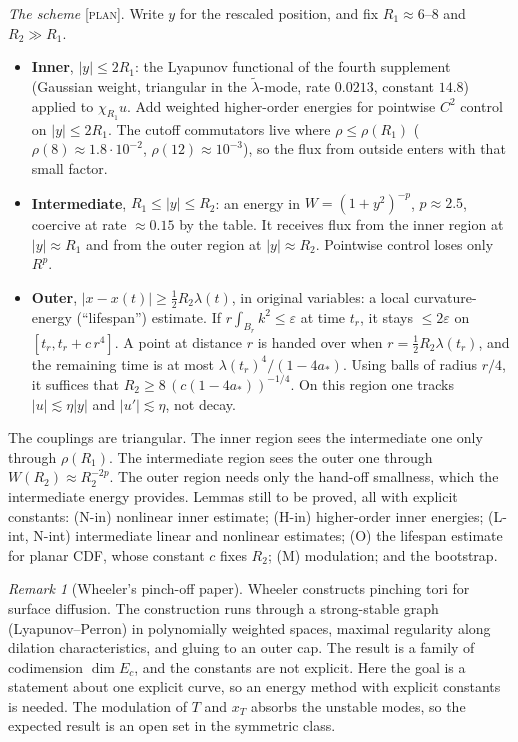 \documentclass[11pt]{amsart}
\theoremstyle{remark}
\newtheorem{remark}[theorem]{Remark}
\newcommand{\eps}{\varepsilon}
\newcommand{\lab}[1]{\textup{\textsc{[#1]}}}
\begin{document}
\emph{The scheme} \lab{plan}. Write $y$ for the rescaled position, and fix $R_1\approx6$--$8$ and $R_2\gg R_1$.
\begin{itemize}
\item \textbf{Inner}, $|y|\le2R_1$: the Lyapunov functional of the fourth supplement (Gaussian weight, triangular in the $\tilde\lambda$-mode, rate $0.0213$, constant $14.8$) applied to $\chi_{R_1}u$. Add weighted higher-order energies for pointwise $C^2$ control on $|y|\le2R_1$. The cutoff commutators live where $\rho\le\rho(R_1)$ ($\rho(8)\approx1.8\cdot10^{-2}$, $\rho(12)\approx10^{-3}$), so the flux from outside enters with that small factor.
\item \textbf{Intermediate}, $R_1\le|y|\le R_2$: an energy in $W=(1+y^2)^{-p}$, $p\approx2.5$, coercive at rate $\approx0.15$ by the table. It receives flux from the inner region at $|y|\approx R_1$ and from the outer region at $|y|\approx R_2$. Pointwise control loses only $R^{p}$.
\item \textbf{Outer}, $|x-x(t)|\ge\frac12R_2\lambda(t)$, in original variables: a local curvature-energy (``lifespan'') estimate. If $r\!\int_{B_r}k^2\le\eps$ at time $t_r$, it stays $\le2\eps$ on $[t_r,t_r+c\,r^4]$. A point at distance $r$ is handed over when $r=\frac12R_2\lambda(t_r)$, and the remaining time is at most $\lambda(t_r)^4/(1-4a_*)$. Using balls of radius $r/4$, it suffices that $R_2\ge8\,(c(1-4a_*))^{-1/4}$. On this region one tracks $|u|\lesssim\eta|y|$ and $|u'|\lesssim\eta$, not decay.
\end{itemize}
The couplings are triangular. The inner region sees the intermediate one only through $\rho(R_1)$. The intermediate region sees the outer one through $W(R_2)\approx R_2^{-2p}$. The outer region needs only the hand-off smallness, which the intermediate energy provides. Lemmas still to be proved, all with explicit constants: (N-in) nonlinear inner estimate; (H-in) higher-order inner energies; (L-int, N-int) intermediate linear and nonlinear estimates; (O) the lifespan estimate for planar CDF, whose constant $c$ fixes $R_2$; (M) modulation; and the bootstrap.

\begin{remark}[Wheeler's pinch-off paper]
Wheeler \cite{W2} constructs pinching tori for surface diffusion. The construction runs through a strong-stable graph (Lyapunov--Perron) in polynomially weighted spaces, maximal regularity along dilation characteristics, and gluing to an outer cap. The result is a family of codimension $\dim E_c$, and the constants are not explicit. Here the goal is a statement about one explicit curve, so an energy method with explicit constants is needed. The modulation of $T$ and $x_T$ absorbs the unstable modes, so the expected result is an open set in the symmetric class.
\end{remark}
\end{document}
